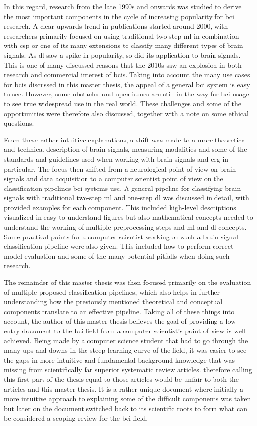 In this regard, research from the late 1990s and onwards was studied to derive the most important components in the cycle of increasing popularity for \gls{bci} research.
A clear upwards trend in publications started around 2000, with researchers primarily focused on using traditional two-step \gls{ml} in combination with \gls{csp} or one of its many extensions to classify many different types of brain signals.
As \gls{dl} saw a spike in popularity, so did its application to brain signals.
This is one of many discussed reasons that the 2010s saw an explosion in both research and commercial interest of \glspl{bci}.
Taking into account the many use cases for \glspl{bci} discussed in this master thesis, the appeal of a general \gls{bci} system is easy to see.
However, some obstacles and open issues are still in the way for \gls{bci} usage to see true widespread use in the real world.
These challenges and some of the opportunities were therefore also discussed, together with a note on some ethical questions.

From these rather intuitive explanations, a shift was made to a more theoretical and technical description of brain signals, measuring modalities and some of the standards and guidelines used when working with brain signals and \gls{eeg} in particular.
The focus then shifted from a neurological point of view on brain signals and data acquisition to a computer scientist point of view on the classification pipelines \gls{bci} systems use.
A general pipeline for classifying brain signals with traditional two-step \gls{ml} and one-step \gls{dl} was discussed in detail, with provided examples for each component.
This included high-level descriptions visualized in easy-to-understand figures but also mathematical concepts needed to understand the working of multiple preprocessing steps and \gls{ml} and \gls{dl} concepts.
Some practical points for a computer scientist working on such a brain signal classification pipeline were also given.
This included how to perform correct model evaluation and some of the many potential pitfalls when doing such research.

The remainder of this master thesis was then focused primarily on the evaluation of multiple proposed classification pipelines, which also helps in further understanding how the previously mentioned theoretical and conceptual components translate to an effective pipeline.
Taking all of these things into account, the author of this master thesis believes the goal of providing a low-entry document to the \gls{bci} field from a computer scientist's point of view is well achieved.
Being made by a computer science student that had to go through the many ups and downs in the steep learning curve of the field, it was easier to see the gaps in more intuitive and fundamental background knowledge that was missing from scientifically far superior systematic review articles.
therefore calling this first part of the thesis equal to those articles would be unfair to both the articles and this master thesis.
It is a rather unique document where initially a more intuitive approach to explaining some of the difficult components was taken but later on the document switched back to its scientific roots to form what can be considered a scoping review for the \gls{bci} field.


